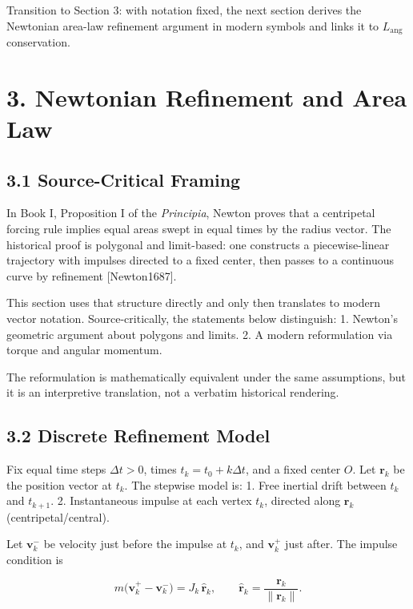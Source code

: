 \documentclass[
]{article}
\begin{document}
Transition to Section 3: with notation fixed, the next section derives
the Newtonian area-law refinement argument in modern symbols and links
it to \(L_{\mathrm{ang}}\) conservation.

\section{3. Newtonian Refinement and Area
Law}\label{newtonian-refinement-and-area-law}

\subsection{3.1 Source-Critical Framing}\label{source-critical-framing}

In Book I, Proposition I of the \emph{Principia}, Newton proves that a
centripetal forcing rule implies equal areas swept in equal times by the
radius vector. The historical proof is polygonal and limit-based: one
constructs a piecewise-linear trajectory with impulses directed to a
fixed center, then passes to a continuous curve by refinement
{[}Newton1687{]}.

This section uses that structure directly and only then translates to
modern vector notation. Source-critically, the statements below
distinguish: 1. Newton's geometric argument about polygons and limits.
2. A modern reformulation via torque and angular momentum.

The reformulation is mathematically equivalent under the same
assumptions, but it is an interpretive translation, not a verbatim
historical rendering.

\subsection{3.2 Discrete Refinement
Model}\label{discrete-refinement-model}

Fix equal time steps \(\Delta t>0\), times \(t_k=t_0+k\Delta t\), and a
fixed center \(O\). Let \(\mathbf r_k\) be the position vector at
\(t_k\). The stepwise model is: 1. Free inertial drift between \(t_k\)
and \(t_{k+1}\). 2. Instantaneous impulse at each vertex \(t_k\),
directed along \(\mathbf r_k\) (centripetal/central).

Let \(\mathbf v_k^{-}\) be velocity just before the impulse at \(t_k\),
and \(\mathbf v_k^{+}\) just after. The impulse condition is

\[
m\big(\mathbf v_k^{+}-\mathbf v_k^{-}\big)=J_k\,\hat{\mathbf r}_k,
\qquad \hat{\mathbf r}_k=\frac{\mathbf r_k}{\|\mathbf r_k\|}.
\]
\end{document}
